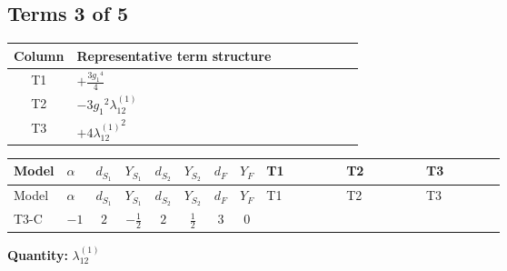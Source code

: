 \documentclass[8pt]{article}
\begin{document}
\begin{landscape}
\subsection*{Terms 3 of 5}
\begin{center}
\begin{tabular}{@{}c >{\raggedright\arraybackslash}p{0.82\linewidth}@{}}
\toprule
Column & Representative term structure \\
\midrule
T1 & \(\displaystyle +\frac{3 {g_1}^4}{4}\) \\
\midrule
T2 & \(\displaystyle -3 {g_1}^2 {\lambda_{12}^{(1)}}\) \\
\midrule
T3 & \(\displaystyle +4 {\lambda_{12}^{(1)}}^2\) \\
\midrule
\bottomrule
\end{tabular}
\end{center}
\smallskip
\tiny
\begin{longtable}{@{}llcccccc >{\raggedright\arraybackslash}p{0.21\linewidth} >{\raggedright\arraybackslash}p{0.21\linewidth} >{\raggedright\arraybackslash}p{0.21\linewidth}@{}}
\toprule
Model & $\alpha$ & $d_{S_1}$ & $Y_{S_1}$ & $d_{S_2}$ & $Y_{S_2}$ & $d_F$ & $Y_F$ & T1 & T2 & T3 \\
\midrule
\endfirsthead
\toprule
Model & $\alpha$ & $d_{S_1}$ & $Y_{S_1}$ & $d_{S_2}$ & $Y_{S_2}$ & $d_F$ & $Y_F$ & T1 & T2 & T3 \\
\midrule
\endhead
T3-C & $-1$ & $2$ & $-\frac{1}{2}$ & $2$ & $\frac{1}{2}$ & $3$ & $0$ & \scriptsize\adjustbox{max width=\linewidth}{$\begin{gathered} +\frac{3 {g_1}^4}{4}\end{gathered}$} & \scriptsize\adjustbox{max width=\linewidth}{$\begin{gathered} -3 {g_1}^2 {\lambda_{12}^{(1)}}\end{gathered}$} & \scriptsize\adjustbox{max width=\linewidth}{$\begin{gathered} +4 {\lambda_{12}^{(1)}}^2\end{gathered}$} \\
\midrule
\bottomrule
\end{longtable}
\clearpage
\noindent\textbf{Quantity: }$\lambda_{12}^{(1)}$\par\smallskip

\end{landscape}
\end{document}
